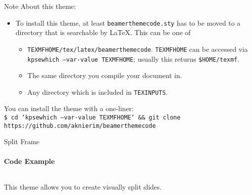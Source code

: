 \begin{frame}{Note}
  About this theme:
  \begin{itemize}
    \item To install this theme, at least \texttt{beamerthemecode.sty} has to be moved to a directory that is searchable by \LaTeX.
      This can be one of
      \begin{itemize}
        \item \texttt{TEXMFHOME/tex/latex/beamerthemecode}. \texttt{TEXMFHOME} can be accessed via \texttt{kpsewhich --var-value TEXMFHOME};
          usually this returns \texttt{\$HOME/texmf}.
        \item The same directory you compile your document in.
        \item Any directory which is included in \texttt{TEXINPUTS}.
      \end{itemize}
  \end{itemize}

  You can install the theme with a one-liner:\\
  \texttt{\footnotesize\$ cd `kpsewhich --var-value TEXMFHOME` \&\& git clone https://github.com/aknierim/beamerthemecode}
\end{frame}


\begin{frame}[split]{Split Frame}
  \framesubtitle{Code Example}
  \begin{columns}[t]
    \begin{column}{0.58\textwidth}
      This theme allows you to create visually split slides.
    \end{column}
    \hfill
    \begin{column}{0.38\textwidth}
        \color{cwhite}
        \inputminted{latex}{content/example_split_frame.tex}
    \end{column}
  \end{columns}
\end{frame}

